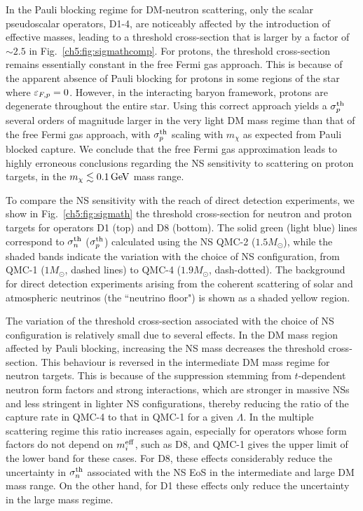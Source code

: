 In the Pauli blocking regime for DM-neutron scattering, only the scalar pseudoscalar operators, D1-4,  are noticeably affected by the introduction of effective masses, leading to a threshold cross-section that is larger by a factor of $\sim2.5$ in Fig.~\ref{ch5:fig:sigmathcomp}. For protons, the threshold cross-section remains essentially constant in the free Fermi gas approach. This is because of the apparent absence of Pauli blocking for protons in some regions of the star where $\varepsilon_{F,p}=0$. However, in the interacting baryon framework, protons are degenerate throughout the entire star. Using this correct approach yields a $\sigma^\mathrm{th}_p$ several orders of magnitude larger in the very light DM mass regime than that of the free Fermi gas approach, with $\sigma^\mathrm{th}_p$ scaling with $m_\chi$ as expected from Pauli blocked capture. 
We conclude that the free Fermi gas approximation leads to highly erroneous conclusions regarding the NS sensitivity to scattering on proton targets, in the $m_\chi\lesssim0.1{\rm \,GeV}$ mass range. 


To compare the NS sensitivity with the reach of direct detection experiments, we show in Fig.~\ref{ch5:fig:sigmath} the threshold cross-section for neutron and proton targets for operators  D1 (top) and D8 (bottom). The solid green (light blue) lines correspond to $\sigma^\mathrm{th}_n$ ($\sigma^\mathrm{th}_p$) calculated using the NS QMC-2 ($1.5 M_\odot$),  while the shaded bands indicate the variation with the choice of NS configuration, from  QMC-1 ($1M_\odot$, dashed lines) to QMC-4 ($1.9 M_\odot$, dash-dotted). The background for direct detection experiments arising from the coherent scattering of solar and atmospheric neutrinos (the ``neutrino floor") is shown as a shaded yellow region. 

The variation of the threshold cross-section associated with the choice of NS configuration is relatively small due to several effects. In the DM mass region affected by Pauli blocking, increasing the NS mass decreases the threshold cross-section. This behaviour is reversed in the intermediate DM mass regime for neutron targets. This is because of the suppression stemming from $t$-dependent neutron form factors and strong interactions, which are stronger in massive NSs and less stringent in lighter NS configurations, thereby reducing the ratio of the capture rate in QMC-4 to that in QMC-1 for a given $\Lambda$. In the multiple scattering regime this ratio increases again, especially for operators whose form factors do not depend on $m_i^{\rm eff}$, such as D8, and  QMC-1 gives the upper limit of the lower band for these cases. For D8, these effects considerably reduce the uncertainty in $\sigma^\mathrm{th}_n$ associated with the NS EoS in the intermediate and large DM mass range. On the other hand, for D1 these effects only reduce the uncertainty in the large mass regime. 

